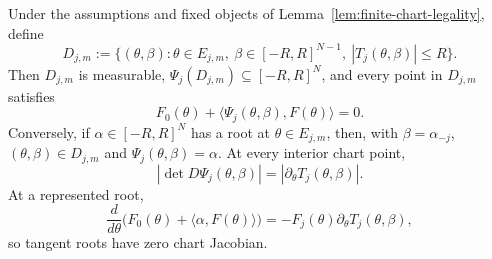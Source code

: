 \begin{lemma}
\label{lem:affine-chart-jacobian}
Under the assumptions and fixed objects of
Lemma~\ref{lem:finite-chart-legality}, define
\[
D_{j,m}:=\{(\theta,\beta):\theta\in E_{j,m},
 \ \beta\in[-R,R]^{N-1},\ |T_j(\theta,\beta)|\leq R\}.
\]
Then $D_{j,m}$ is measurable,
$\Psi_j(D_{j,m})\subseteq[-R,R]^N$, and every point in $D_{j,m}$ satisfies
\begin{equation}
F_0(\theta)+\langle\Psi_j(\theta,\beta),F(\theta)\rangle=0.
\label{eq:appendix-31}
\end{equation}
Conversely, if $\alpha\in[-R,R]^N$ has a root at
$\theta\in E_{j,m}$, then, with $\beta=\alpha_{-j}$,
$(\theta,\beta)\in D_{j,m}$ and $\Psi_j(\theta,\beta)=\alpha$.  At every
interior chart point,
\begin{equation}
|\det D\Psi_j(\theta,\beta)|
=|\partial_\theta T_j(\theta,\beta)|.
\label{eq:appendix-32}
\end{equation}
At a represented root,
\begin{equation}
\frac d{d\theta}
\bigl(F_0(\theta)+\langle\alpha,F(\theta)\rangle\bigr)
=-F_j(\theta)\partial_\theta T_j(\theta,\beta),
\label{eq:appendix-33}
\end{equation}
so tangent roots have zero chart Jacobian.
\end{lemma}

